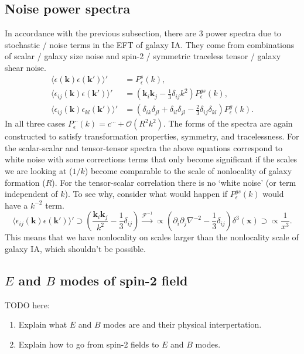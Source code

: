 \documentclass[11pt]{article}
\newcommand{\br}[1]{\ensuremath{\left( #1 \right)}}
\begin{document}
\subsection{Noise power spectra}
\label{subsec:noisepowerspectragalaxyIA}
In accordance with the previous subsection, there are 3 power spectra due to stochastic / noise terms in the EFT of galaxy IA. They come from combinations of scalar / galaxy size noise and spin-2 / symmetric traceless tensor / galaxy shear noise.
\begin{align}
    \langle \epsilon(\mathbf k)\epsilon(\mathbf k') \rangle' &= P^s_\epsilon(k), \\
    \langle \epsilon_{ij}(\mathbf k)\epsilon(\mathbf k') \rangle' &= (\mathbf k_i \mathbf k_j - \frac{1}{3} \delta_{ij}k^2)P^{gs}_\epsilon(k), \\
    \langle \epsilon_{ij}(\mathbf k)\epsilon_{kl}(\mathbf k') \rangle' &= (\delta_{ik}\delta_{jl}+\delta_{il}\delta_{jl}-\frac{2}{3}\delta_{ij}\delta_{kl})P^g_\epsilon(k) .
\end{align}
In all three cases $P_{\epsilon}^{\cdots}(k) = c^{\cdots} + \mathcal O(R^2k^2)$. The forms of the spectra are again constructed to satisfy transformation properties, symmetry, and tracelessness. For the scalar-scalar and tensor-tensor spectra the above equations correspond to white noise with some corrections terms that only become significant if the scales we are looking at ($1/k$) become comparable to the scale of nonlocality of galaxy formation ($R$). For the tensor-scalar correlation there is no `white noise' (or term independent of $k$). To see why, consider what would happen if $P^{gs}_\epsilon(k)$ would have a $k^{-2}$ term.
\begin{equation}
    \langle \epsilon_{ij}(\mathbf k)\epsilon(\mathbf k') \rangle' \supset \br{ \frac{\mathbf k_i\mathbf k_j}{k^2} - \frac{1}{3}\delta_{ij}} \xrightarrow{\mathcal F^{-1}}\propto (\partial_i\partial_j\nabla^{-2} - \frac{1}{3}\delta_{ij})\delta^{3}(\mathbf x) \supset \propto \frac{1}{x^3}.
\end{equation}
This means that we have nonlocality on scales larger than the nonlocality scale of galaxy IA, which shouldn't be possible.

\subsection{$E$ and $B$ modes of spin-2 field}
TODO here:
\begin{enumerate}
    \item Explain what $E$ and $B$ modes are and their physical interpertation.
    \item Explain how to go from spin-2 fields to $E$ and $B$ modes.
\end{enumerate}
\end{document}
